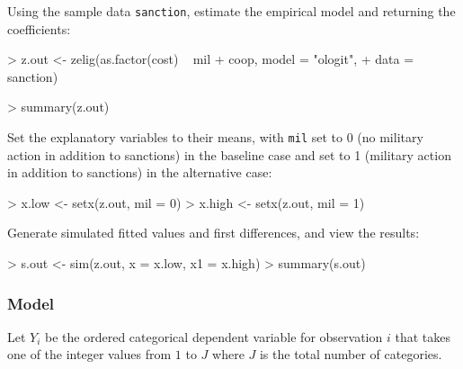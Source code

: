 \begin{enumerate}
Using the sample data \texttt{sanction}, estimate the empirical model and returning the coefficients:
\begin{Schunk}
\begin{Sinput}
> z.out <- zelig(as.factor(cost) ~ mil + coop, model = "ologit", 
+     data = sanction)
\end{Sinput}
\end{Schunk}
\begin{Schunk}
\begin{Sinput}
> summary(z.out)
\end{Sinput}
\end{Schunk}
Set the explanatory variables to their means, with {\tt mil} set
to 0 (no military action in addition to sanctions) in the baseline
case and set to 1 (military action in addition to sanctions) in the
alternative case:
\begin{Schunk}
\begin{Sinput}
> x.low <- setx(z.out, mil = 0)
> x.high <- setx(z.out, mil = 1)
\end{Sinput}
\end{Schunk}
Generate simulated fitted values and first differences, and view the results:
\begin{Schunk}
\begin{Sinput}
> s.out <- sim(z.out, x = x.low, x1 = x.high)
> summary(s.out)
\end{Sinput}
\end{Schunk}
\end{enumerate}

\subsubsection{Model}

Let $Y_i$ be the ordered categorical dependent variable for
observation $i$ that takes one of the integer values from $1$ to $J$
where $J$ is the total number of categories.
  

